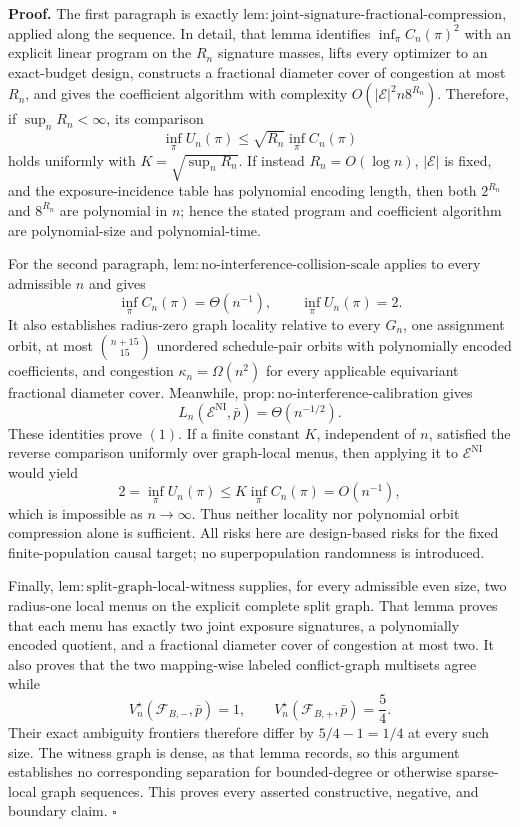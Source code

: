 \textbf{Proof.}
The first paragraph is exactly \(\mathrm{lem{:}joint\text{-}signature\text{-}fractional\text{-}compression}\), applied along the sequence. In detail, that lemma identifies \(\inf_\pi C_n(\pi)^2\) with an explicit linear program on the \(R_n\) signature masses, lifts every optimizer to an exact-budget design, constructs a fractional diameter cover of congestion at most \(R_n\), and gives the coefficient algorithm with complexity \(O(|\mathcal E|^2n8^{R_n})\). Therefore, if \(\sup_n R_n<\infty\), its comparison
\[
 \inf_\pi U_n(\pi)
 \le \sqrt{R_n}\inf_\pi C_n(\pi)
\]
holds uniformly with \(K=\sqrt{\sup_nR_n}\). If instead \(R_n=O(\log n)\), \(|\mathcal E|\) is fixed, and the exposure-incidence table has polynomial encoding length, then both \(2^{R_n}\) and \(8^{R_n}\) are polynomial in \(n\); hence the stated program and coefficient algorithm are polynomial-size and polynomial-time.

For the second paragraph, \(\mathrm{lem{:}no\text{-}interference\text{-}collision\text{-}scale}\) applies to every admissible \(n\) and gives
\[
 \inf_\pi C_n(\pi)=\Theta(n^{-1}),
 \qquad
 \inf_\pi U_n(\pi)=2.
\]
It also establishes radius-zero graph locality relative to every \(G_n\), one assignment orbit, at most \(\binom{n+15}{15}\) unordered schedule-pair orbits with polynomially encoded coefficients, and congestion \(\kappa_n=\Omega(n^2)\) for every applicable equivariant fractional diameter cover. Meanwhile, \(\mathrm{prop{:}no\text{-}interference\text{-}calibration}\) gives
\[
 L_n(\mathcal E^{\mathrm{NI}},\bar p)=\Theta(n^{-1/2}).
\]
These identities prove \((1)\). If a finite constant \(K\), independent of \(n\), satisfied the reverse comparison uniformly over graph-local menus, then applying it to \(\mathcal E^{\mathrm{NI}}\) would yield
\[
 2=\inf_\pi U_n(\pi)
 \le K\inf_\pi C_n(\pi)
 =O(n^{-1}),
\]
which is impossible as \(n\to\infty\). Thus neither locality nor polynomial orbit compression alone is sufficient. All risks here are design-based risks for the fixed finite-population causal target; no superpopulation randomness is introduced.

Finally, \(\mathrm{lem{:}split\text{-}graph\text{-}local\text{-}witness}\) supplies, for every admissible even size, two radius-one local menus on the explicit complete split graph. That lemma proves that each menu has exactly two joint exposure signatures, a polynomially encoded quotient, and a fractional diameter cover of congestion at most two. It also proves that the two mapping-wise labeled conflict-graph multisets agree while
\[
 V_n^\star(\mathcal F_{B,-},\bar p)=1,
 \qquad
 V_n^\star(\mathcal F_{B,+},\bar p)=\frac54.
\]
Their exact ambiguity frontiers therefore differ by \(5/4-1=1/4\) at every such size. The witness graph is dense, as that lemma records, so this argument establishes no corresponding separation for bounded-degree or otherwise sparse-local graph sequences. This proves every asserted constructive, negative, and boundary claim. \(\square\)